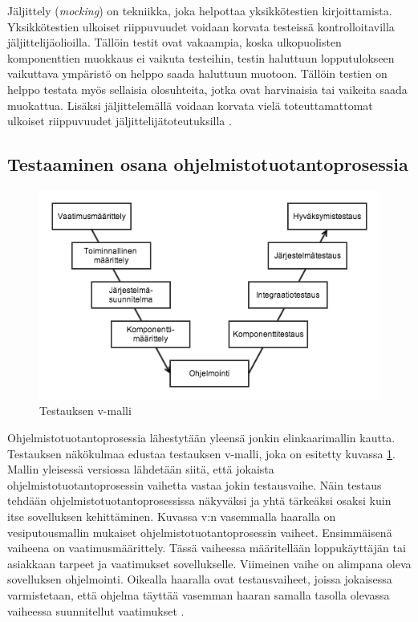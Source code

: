 Jäljittely (\emph{mocking}) on tekniikka, joka helpottaa yksikkötestien kirjoittamista. Yksikkötestien ulkoiset riippuvuudet voidaan korvata testeissä kontrolloitavilla jäljittelijäolioilla. Tällöin testit ovat vakaampia, koska ulkopuolisten komponenttien muokkaus ei vaikuta testeihin, testin haluttuun lopputulokseen vaikuttava ympäristö on helppo saada haluttuun muotoon. Tällöin testien on helppo testata myös sellaisia olosuhteita, jotka ovat harvinaisia tai vaikeita saada muokattua. Lisäksi jäljittelemällä voidaan korvata vielä toteuttamattomat ulkoiset riippuvuudet jäljittelijätoteutuksilla \cite{mocking}.

\subsection{Testaaminen osana ohjelmistotuotantoprosessia}

\begin{figure}[h]
\centering
\includegraphics[width=140mm]{v_malli.png}
\caption{Testauksen v-malli \protect\cite[40]{testing_foundations}} \label{v_model}
\end{figure}

Ohjelmistotuotantoprosessia lähestytään yleensä jonkin elinkaarimallin kautta. Testauksen näkökulmaa edustaa testauksen v-malli, joka on esitetty kuvassa \ref{v_model}. Mallin yleisessä versiossa lähdetään siitä, että jokaista ohjelmistotuotantoprosessin vaihetta vastaa jokin testausvaihe. Näin testaus tehdään ohjelmistotuotantoprosessissa näkyväksi ja yhtä tärkeäksi osaksi kuin itse sovelluksen kehittäminen. Kuvassa v:n vasemmalla haaralla on vesiputousmallin mukaiset ohjelmistotuotantoprosessin vaiheet. Ensimmäisenä vaiheena on vaatimusmäärittely. Tässä vaiheessa määritellään loppukäyttäjän tai asiakkaan tarpeet ja vaatimukset sovellukselle.  Viimeinen vaihe on alimpana oleva sovelluksen ohjelmointi. Oikealla haaralla ovat testausvaiheet, joissa jokaisessa varmistetaan, että ohjelma täyttää vasemman haaran samalla tasolla olevassa vaiheessa suunnitellut vaatimukset \cite[39-42]{testing_foundations}.

